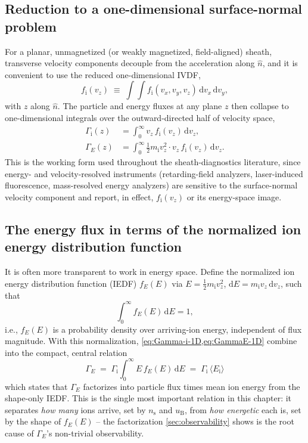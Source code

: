 \subsection{Reduction to a one-dimensional surface-normal problem}

For a planar, unmagnetized (or weakly magnetized, field-aligned) sheath, transverse velocity components decouple from the acceleration along $\hat n$, and it is convenient to use the reduced one-dimensional IVDF,
\begin{equation}
f_{\mathrm{i}}(v_z) \;\equiv\; \int\!\!\int f_{\mathrm{i}}(v_x, v_y, v_z)\, \mathrm{d}v_x\, \mathrm{d}v_y,
\end{equation}
with $z$ along $\hat n$. The particle and energy fluxes at any plane $z$ then collapse to one-dimensional integrals over the outward-directed half of velocity space,
\begin{align}
\Gamma_{\mathrm{i}}(z) &= \int_0^{\infty} v_z\, f_{\mathrm{i}}(v_z)\, \mathrm{d}v_z, \label{eq:Gamma-i-1D}\\
\Gamma_{E}(z) &= \int_0^{\infty} \tfrac{1}{2} m_{\mathrm{i}} v_z^2 \cdot v_z\, f_{\mathrm{i}}(v_z)\, \mathrm{d}v_z. \label{eq:GammaE-1D}
\end{align}
This is the working form used throughout the sheath-diagnostics literature, since energy- and velocity-resolved instruments (retarding-field analyzers, laser-induced fluorescence, mass-resolved energy analyzers) are sensitive to the surface-normal velocity component and report, in effect, $f_{\mathrm{i}}(v_z)$ or its energy-space image.

\subsection{The energy flux in terms of the normalized ion energy distribution function}

It is often more transparent to work in energy space. Define the normalized ion energy distribution function (IEDF) $f_E(E)$ via $E = \tfrac12 m_{\mathrm{i}} v_z^2$, $\mathrm{d}E = m_{\mathrm{i}} v_z\, \mathrm{d}v_z$, such that
\begin{equation}
\int_0^{\infty} f_E(E)\, \mathrm{d}E = 1,
\end{equation}
i.e., $f_E(E)$ is a probability density over arriving-ion energy, independent of flux magnitude. With this normalization, \cref{eq:Gamma-i-1D,eq:GammaE-1D} combine into the compact, central relation
\begin{equation}
\boxed{\;\Gamma_{E} \;=\; \Gamma_{\mathrm{i}} \int_0^{\infty} E\, f_E(E)\, \mathrm{d}E \;=\; \Gamma_{\mathrm{i}}\, \langle E_{\mathrm{i}} \rangle\;}
\label{eq:GammaE-factorized}
\end{equation}
which states that $\Gamma_{E}$ factorizes into particle flux times mean ion energy from the shape-only IEDF. This is the single most important relation in this chapter: it separates \emph{how many} ions arrive, set by $n_{\mathrm{s}}$ and $u_{\mathrm{B}}$, from \emph{how energetic} each is, set by the shape of $f_E(E)$ -- the factorization \cref{sec:observability} shows is the root cause of $\Gamma_{E}$'s non-trivial observability.

